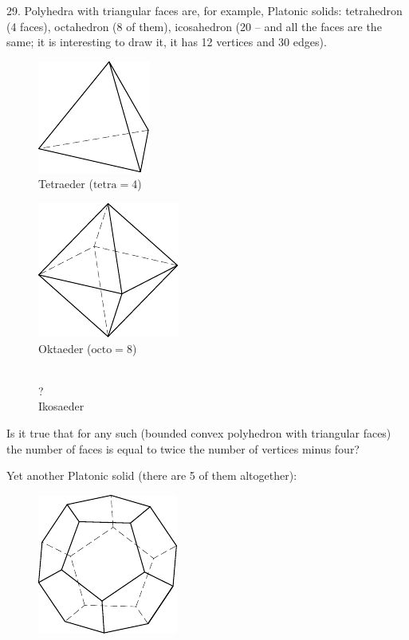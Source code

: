 \begin{problem}{29.}
	Polyhedra with triangular faces are, for example, Platonic solids: tetrahedron (4 faces),
	octahedron (8 of them), icosahedron (20 -- and all the faces are the same; it is interesting to draw it,
	it has 12 vertices and 30 edges).
	\begin{figure}
		\footnotesize
		\null\hfill
		\parbox{0.3\linewidth}{\centering\includegraphics{taskbook-131}\\Tetraeder ($\text{tetra}= 4$)}
		\hfill
		\parbox{0.3\linewidth}{\centering\includegraphics{taskbook-132}\\Oktaeder ($\text{octo}= 8$)}
		\hfill\null\\
		{\Huge ?}\\Ikosaeder
	\end{figure}
	Is it true that for any such (bounded convex polyhedron with triangular faces) the number of faces is
	equal to twice the number of vertices minus four?


	Yet another Platonic solid (there are 5 of them altogether):
	\begin{figure}
		\includegraphics{taskbook-14}
	\end{figure}
\end{problem}

